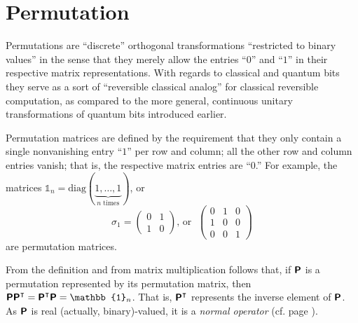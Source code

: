 \section{Permutation}
\label{2018-permutation}

Permutations are  ``discrete'' orthogonal transformations
``restricted to binary values''
in the sense that
they merely allow the entries ``$0$'' and ``$1$'' in their respective matrix representations.
With regards to classical and quantum bits\cite{mermin-04,mermin-07}
they serve as a sort of ``reversible classical analog'' for classical reversible computation,
as compared to the more general, continuous unitary transformations of quantum bits introduced earlier.

{\color{blue}
\bexample
Permutation matrices are defined by the requirement that they only contain a single nonvanishing entry ``$1$'' per row and column;
all the other row and column entries vanish; that is, the respective matrix entries are ``$0$.''
For example, the matrices $\mathbb{1}_n=\textrm{diag}(\underbrace{1,\ldots ,1}_{n \textrm{ times}})$,
or
\begin{equation}
\sigma_1=
\begin{pmatrix}
0&1\\
1&0
\end{pmatrix}
\textrm{, or }\;
\begin{pmatrix}
0&1&0\\
1&0&0\\
0&0&1
\end{pmatrix}
\end{equation}
are permutation matrices.
\eexample
}

From the definition and from matrix multiplication follows that,
if $\textsf{\textbf{P}}$ is a permutation represented by its permutation matrix,
then $\textsf{\textbf{P}}\textsf{\textbf{P}}^\intercal =\textsf{\textbf{P}}^\intercal  \textsf{\textbf{P}}=\mathbb{1}_n$.
That is, $\textsf{\textbf{P}}^\intercal $ represents the inverse element of $\textsf{\textbf{P}}$.
As $\textsf{\textbf{P}}$ is real (actually, binary)-valued, it is a {\em normal operator} (cf. page \pageref{2014-m-fdvs-normality}).


